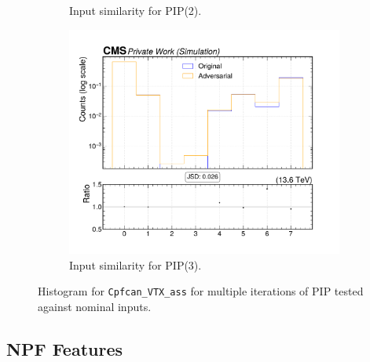 \begin{figure}[htbp]
\begin{subfigure}[t]{0.32\textwidth}
    \caption{Input similarity for PIP(2).}
  \end{subfigure}\hfill
  \begin{subfigure}[t]{0.32\textwidth}
    \includegraphics[width=\linewidth]{media/output/features/compare/intprob_3/cmp_cpf_arr_Cpfcan_VTX_ass.pdf}
    \caption{Input similarity for PIP(3).}
  \end{subfigure}

  \caption{Histogram for \texttt{Cpfcan\_VTX\_ass} for multiple iterations of PIP tested against nominal inputs.}
  \label{fig:intprob_input_Cpfcan_VTX_ass}
\end{figure}

\newpage
\subsection*{NPF Features}


